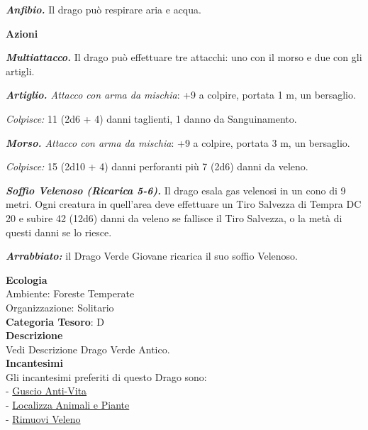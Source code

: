\begin{multicols}{2}
{\emph{\textbf{Anfibio.}} Il drago può respirare aria e acqua.

\textbf{Azioni}

\emph{\textbf{Multiattacco.}} Il drago può effettuare tre attacchi: uno con il morso e due con gli artigli.

\emph{\textbf{Artiglio.} Attacco con arma da mischia}: +9 a colpire, portata 1 m, un bersaglio.

\emph{Colpisce:} 11 (2d6 + 4) danni taglienti, 1 danno da Sanguinamento.

\emph{\textbf{Morso.} Attacco con arma da mischia}: +9 a colpire, portata 3 m, un bersaglio.

\emph{Colpisce:} 15 (2d10 + 4) danni perforanti più 7 (2d6) danni da veleno.

\emph{\textbf{Soffio Velenoso (Ricarica 5-6).}} Il drago esala gas velenosi in un cono di 9 metri. Ogni creatura in quell'area deve effettuare un Tiro Salvezza di Tempra DC 20 e subire 42 (12d6) danni da veleno se fallisce il Tiro Salvezza, o la metà di questi danni se lo riesce.

\emph{\textbf{Arrabbiato:}} il Drago Verde Giovane ricarica il suo soffio Velenoso.

\textbf{Ecologia}\\
Ambiente: Foreste Temperate\\
Organizzazione: Solitario\\
\textbf{Categoria Tesoro}: D\\
\textbf{Descrizione}\\
Vedi Descrizione Drago Verde Antico.\\
\textbf{Incantesimi}\\
Gli incantesimi preferiti di questo Drago sono:\\
- \hyperlink{Guscio Anti-Vita}{Guscio Anti-Vita}\\
- \hyperlink{Localizza Animali e Piante}{Localizza Animali e Piante}\\
- \hyperlink{Rimuovi Veleno}{Rimuovi Veleno}

}
\end{multicols}
